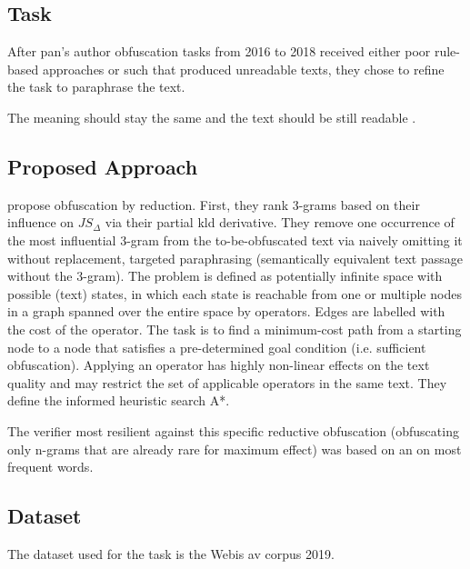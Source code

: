 \subsection{Task}
After \ac{pan}'s author obfuscation tasks from 2016 to 2018 received either poor rule-based approaches or such that 
produced unreadable texts, they chose to refine the task to paraphrase the text.

\begin{definition}
    [Paraphrase]
    The meaning should stay the same and the text should be still readable \citep{bevendorff_divergence_based_2020}.
\end{definition}

\subsection{Proposed Approach}
\citet{bevendorff_divergence_based_2020} propose obfuscation by reduction.
First, they rank 3-grams based on their influence on $JS_\Delta$ via their partial \ac{kld} derivative.
They remove one occurrence of the most influential 3-gram from the to-be-obfuscated text via naively omitting it without replacement, 
targeted paraphrasing (semantically equivalent text passage without the 3-gram).
The problem is defined as potentially infinite space with possible (text) states, 
in which each state is reachable from one or multiple nodes in a graph spanned over the entire space by operators.
Edges are labelled with the cost of the operator.
The task is to find a minimum-cost path from a starting node to a node that satisfies a pre-determined goal condition 
(i.e. sufficient obfuscation).
Applying an operator has highly non-linear effects on the text quality and may restrict the set of applicable operators in the same text.
They define the informed heuristic search A*.

The verifier most resilient against this specific reductive obfuscation (obfuscating only n-grams that are already rare for maximum effect) 
was based on an \impAppr{} on most frequent words.

\subsection{Dataset}
The dataset used for the task is the Webis \acl{av} corpus 2019.